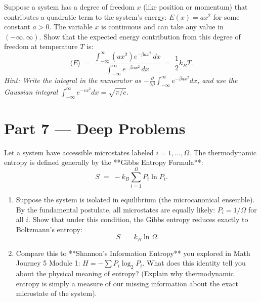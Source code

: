 \documentclass[12pt, a4paper, twoside]{book}
\newcounter{problem}[chapter]
\begin{document}
\begin{problem}
Suppose a system has a degree of freedom $x$ (like position or momentum) that contributes a quadratic term to the system's energy: $E(x) = a x^2$ for some constant $a > 0$. The variable $x$ is continuous and can take any value in $(-\infty, \infty)$.
Show that the expected energy contribution from this degree of freedom at temperature $T$ is:
\[
  \langle E \rangle \;=\; \frac{\int_{-\infty}^\infty (a x^2) e^{-\beta a x^2} \, dx}{\int_{-\infty}^\infty e^{-\beta a x^2} \, dx} \;=\; \frac{1}{2} k_B T.
\]
\textit{Hint: Write the integral in the numerator as $-\frac{\partial}{\partial \beta} \int_{-\infty}^\infty e^{-\beta a x^2} dx$, and use the Gaussian integral $\int_{-\infty}^\infty e^{-c x^2} dx = \sqrt{\pi/c}$.}
\end{problem}

\newpage

\section{Part 7 --- Deep Problems}

\begin{deepproblem}
Let a system have accessible microstates labeled $i = 1, \dots, \Omega$.
The thermodynamic entropy is defined generally by the **Gibbs Entropy Formula**:
\[
  S \;=\; -k_B \sum_{i=1}^\Omega P_i \ln P_i.
\]
\begin{enumerate}[label=(\alph*)]
  \item Suppose the system is isolated in equilibrium (the microcanonical ensemble). By the fundamental postulate, all microstates are equally likely: $P_i = 1/\Omega$ for all $i$. Show that under this condition, the Gibbs entropy reduces exactly to Boltzmann's entropy:
  \[
    S \;=\; k_B \ln \Omega.
  \]
  \item Compare this to **Shannon's Information Entropy** you explored in Math Journey 5 Module 1: $H = -\sum P_i \log_2 P_i$. What does this identity tell you about the physical meaning of entropy? (Explain why thermodynamic entropy is simply a measure of our missing information about the exact microstate of the system).
\end{enumerate}
\end{deepproblem}
\end{document}

